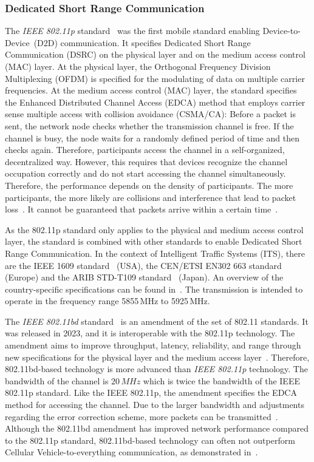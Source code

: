 \subsubsection{Dedicated Short Range Communication}

The \textit{IEEE 802.11p} standard~\cite{802.11p-2010-com} was the first mobile standard enabling Device-to-Device~(D2D) communication. It specifies Dedicated Short Range Communication (DSRC) on the physical layer and on the medium access control (MAC) layer. At the physical layer, the Orthogonal Frequency Division Multiplexing (OFDM) is specified for the modulating of data on multiple carrier frequencies.
At the medium access control (MAC) layer, the standard specifies the Enhanced Distributed Channel Access (EDCA) method that employs carrier sense multiple access with collision avoidance (CSMA/CA): Before a packet is sent, the network node checks whether the transmission channel is free. If the channel is busy, the node waits for a randomly defined period of time and then checks again.
Therefore, participants access the channel in a self-organized, decentralized way. However, this requires that devices recognize the channel occupation correctly and do not start accessing the channel simultaneously. Therefore, the performance depends on the density of participants. The more participants, the more likely are collisions and interference that lead to packet loss~\cite{shrestha-2020-com}. It cannot be guaranteed that packets arrive within a certain time~\cite{shrestha-2020-com}.

As the 802.11p standard only applies to the physical and medium access control layer, the standard is combined with other standards to enable Dedicated Short Range Communication. In the context of Intelligent Traffic Systems (ITS), there are the IEEE 1609 standard~\cite{ieee-2016-IEEEStd1609.4-com} (USA), the CEN/ETSI EN302 663 standard~\cite{etsi-2019-EN302663-com} (Europe) and the ARIB STD-T109 standard~\cite{its-2012-T109-com} (Japan). An overview of the country-specific specifications can be found in~\cite{costandoiu-2019-com}.
The transmission is intended to operate in the frequency range 5855\,MHz to 5925\,MHz. 

The \textit{IEEE 802.11bd} standard~\cite{ieee802.11bd-2022-com} is an amendment of the set of 802.11 standards. It was released in 2023, and it is interoperable with the 802.11p technology. The amendment aims to improve throughput, latency, reliability, and range through new specifications for the physical layer and the medium access layer~\cite{yacheur-2020-com}.  Therefore, 802.11bd-based technology is more advanced than \textit{IEEE 802.11p} technology. The bandwidth of the channel is $20\,MHz$ which is twice the bandwidth of the IEEE 802.11p standard. Like the IEEE 802.11p, the amendment specifies the EDCA method for accessing the channel. Due to the larger bandwidth and adjustments regarding the error correction scheme, more packets can be transmitted~\cite{yacheur-2020-com}. 
Although the 802.11bd amendment has improved network performance compared to the 802.11p standard, 802.11bd-based technology can often not outperform Cellular Vehicle-to-everything communication, as demonstrated in~\cite{anwar-2019-com}.


